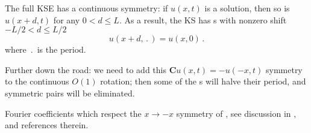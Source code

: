 The full KSE has a continuous symmetry: if
$u(x,t)$ is a solution, then so is $u(x+d,t)$ for any
$0 < d \leq L$.  As a result,
the KS has \rpo s with nonzero shift $-L/2 < d \leq L/2$
\[ u(x+d,\period{}) = u(x,0)
\,.
\]
where $\period{}$ is the period. 

Further down the road: we need to add this
$\mathbf{C} u(x,t) = -u(-x,t)$ symmetry
 to the continuous $O(1)$ rotation; then some of the \rpo s will
 halve their period, and symmetric pairs will be eliminated.

Fourier coefficients which respect the $x \to -x$ symmetry of
\KSe, see discussion in ,
and references therein.



